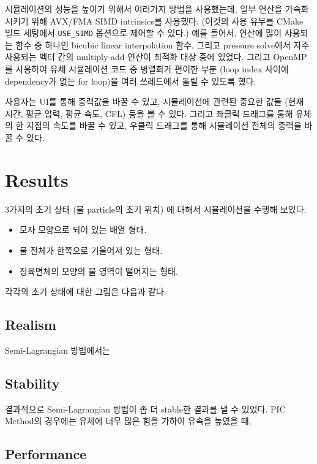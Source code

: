 \documentclass[10pt, A4]{article}
\begin{document}
시뮬레이션의 성능을 높이기 위해서 여러가지 방법을 사용했는데, 일부 연산을 가속화시키기 위해 AVX/FMA SIMD intrinsics를 사용했다. (이것의 사용 유무를 CMake 빌드 세팅에서 \texttt{USE\_SIMD} 옵션으로 제어할 수 있다.) 예를 들어서, 연산에 많이 사용되는 함수 중 하나인 bicubic linear interpolation 함수, 그리고 pressure solve에서 자주 사용되는 벡터 간의 multiply-add 연산이 최적화 대상 중에 있었다.  그리고 OpenMP를 사용하여 유체 시뮬레이션 코드 중 병렬화가 편이한 부분 (loop index 사이에 dependency가 없는 for loop)을 여러 쓰레드에서 돌릴 수 있도록 했다.

사용자는 UI를 통해 중력값을 바꿀 수 있고, 시뮬레이션에 관련된 중요한 값들 (현재 시간, 평균 압력, 평균 속도, CFL) 등을 볼 수 있다. 그리고 좌클릭 드래그를 통해 유체의 한 지점의 속도를 바꿀 수 있고, 우클릭 드래그를 통해 시뮬레이션 전체의 중력을 바꿀 수 있다.

\section{Results}

3가지의 초기 상태 (물 particle의 초기 위치) 에 대해서 시뮬레이션을 수행해 보있다.

\begin{itemize}
  \item 모자 모양으로 되어 있는 배열 형태.
  \item 물 전체가 한쪽으로 기울어져 있는 형태.
  \item 정육면체의 모양의 물 영역이 떨어지는 형태.
\end{itemize}

각각의 초기 상태에 대한 그림은 다음과 같다.

\subsection{Realism}

Semi-Lagrangian 방법에서는 

\subsection{Stability}

결과적으로 Semi-Lagrangian 방법이 좀 더 stable한 결과를 낼 수 있었다. PIC Method의 경우에는 유체에 너무 많은 힘을 가하여 유속을 높였을 때, 

\subsection{Performance}
\end{document}
